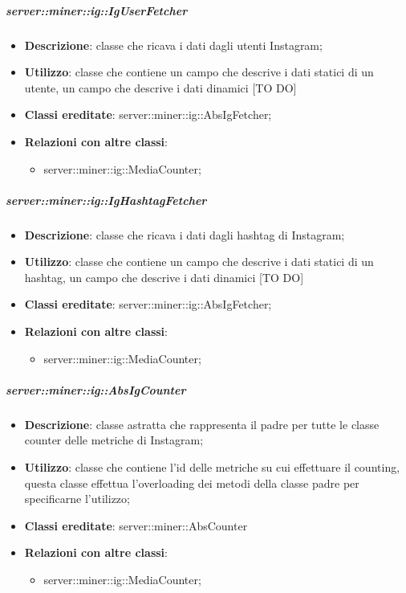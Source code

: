 	\subparagraph{server::miner::ig::IgUserFetcher} %
		\label{subp:server_miner_ig_IgUserFetcher}
			\begin{itemize}
				\item \textbf{Descrizione}: classe che ricava i dati dagli utenti Instagram;
				\item \textbf{Utilizzo}: classe che contiene un campo che descrive i dati statici di un utente, un campo che descrive i dati dinamici [TO DO]
				\item \textbf{Classi ereditate}: server::miner::ig::AbsIgFetcher;
				\item \textbf{Relazioni con altre classi}:
					\begin{itemize}
						\item server::miner::ig::MediaCounter;
					\end{itemize}
			\end{itemize}

	\subparagraph{server::miner::ig::IgHashtagFetcher} %
		\label{subp:server_miner_ig_IgHashtagFetcher}
			\begin{itemize}
				\item \textbf{Descrizione}: classe che ricava i dati dagli hashtag di Instagram;
				\item \textbf{Utilizzo}: classe che contiene un campo che descrive i dati statici di un hashtag, un campo che descrive i dati dinamici [TO DO]
				\item \textbf{Classi ereditate}: server::miner::ig::AbsIgFetcher;
				\item \textbf{Relazioni con altre classi}:
					\begin{itemize}
						\item server::miner::ig::MediaCounter;
					\end{itemize}
			\end{itemize}

	\subparagraph{server::miner::ig::AbsIgCounter} %
		\label{subp:server_miner_ig_AbsIgCounter}
			\begin{itemize}
				\item \textbf{Descrizione}: classe astratta che rappresenta il padre per tutte le classe counter delle metriche di Instagram;
				\item \textbf{Utilizzo}: classe che contiene l’id delle metriche su cui effettuare il counting, questa classe effettua l’overloading dei metodi della classe padre per specificarne l’utilizzo;
				\item \textbf{Classi ereditate}: server::miner::AbsCounter
				\item \textbf{Relazioni con altre classi}:
					\begin{itemize}
						\item server::miner::ig::MediaCounter;
					\end{itemize}
			\end{itemize}


